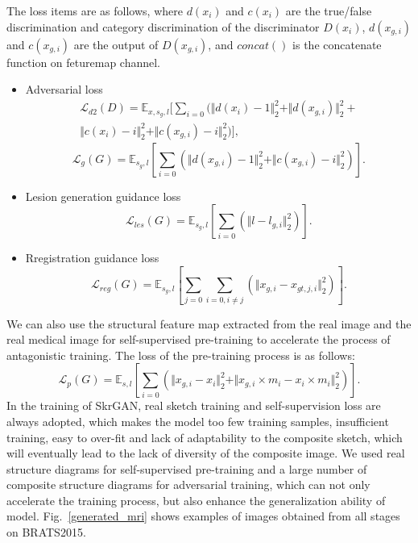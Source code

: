 \documentclass[runningheads]{llncs}
\begin{document}
	The loss items are as follows, where $d(x_{i})$ and $c(x_{i})$ are the true/false discrimination and category discrimination of the discriminator $D(x_i)$, $d(x_{g, i})$ and $c(x_{g,i})$ are the output of $D(x_{g,i})$, and $concat()$ is the concatenate function on feturemap channel. 
	\begin{itemize}
		\item{Adversarial loss}
		\begin{equation}
		\begin{split}
		\mathcal{L}_{d2}(D)=\mathbb{E}_{x,s_g,l}[\sum\limits_{i=0}(\Vert{d(x_i)-1}\Vert_{2}^{2}+\Vert{d(x_{g,i})}\Vert_{2}^{2}+\\
		\Vert{c(x_i)-i}\Vert_{2}^{2}+\Vert{c(x_{g,i})-i}\Vert_{2}^{2})],
		\end{split}
		\end{equation}
		\begin{equation}
		\mathcal{L}_{g}(G)=\mathbb{E}_{s_g,l}[\sum\limits_{i=0}(\Vert{d(x_{g,i})-1}\Vert_{2}^{2}+\Vert{c(x_{g,i})-i}\Vert_{2}^{2})].
		\end{equation}
		\item{Lesion generation guidance loss}
		\begin{equation}
		\mathcal{L}_{les}(G)=\mathbb{E}_{s_g,l}[\sum\limits_{i=0}(\Vert{l-l_{g,i}}\Vert_{2}^{2})].
		\end{equation}
		\item{Rregistration guidance loss}
		\begin{equation}
		\mathcal{L}_{reg}(G)=\mathbb{E}_{s_g,l}[\sum\limits_{j=0}\sum\limits_{i=0,i\neq j}(\Vert{x_{g,i}-x_{gt,j,i}}\Vert_{2}^{2})].
		\end{equation}
	\end{itemize}
	We can also use the structural feature map extracted from the real image and the real medical image for self-supervised pre-training to accelerate the process of antagonistic training. The loss of the pre-training process is as follows:
	\begin{equation}
	\mathcal{L}_{p}(G)=\mathbb{E}_{s,l}[\sum\limits_{i=0}(\Vert{x_{g,i}-x_i}\Vert_{2}^{2}+\Vert{x_{g,i}\times m_i-x_{i}\times m_i}\Vert_{2}^{2})].
	\end{equation}
	In the training of SkrGAN\cite{96zhang2019skrgan:}, real sketch training and self-supervision loss are always adopted, which makes the model too few training samples, insufficient training, easy to over-fit and lack of adaptability to the composite sketch, which will eventually lead to the lack of diversity of the composite image. We used real structure diagrams for self-supervised pre-training and a large number of composite structure diagrams for adversarial training, which can not only accelerate the training process, but also enhance the generalization ability of model. Fig.~\ref{generated_mri} shows examples of images obtained from all stages on BRATS2015.
\end{document}
